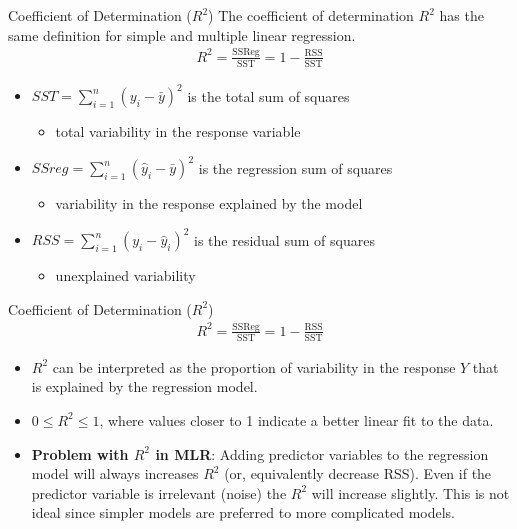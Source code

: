 \documentclass[10pt]{beamer}
\begin{document}
\begin{frame}{Coefficient of Determination ($R^2$)}
The coefficient of determination $R^2$ has the same definition for simple and multiple linear regression.
\begin{align*}
R^2 = \frac{\text{SSReg}}{\text{SST}} = 1 - \frac{\text{RSS}}{\text{SST}}
\end{align*}
\begin{itemize}
\item $SST = \sum_{i=1}^n (y_i - \bar{y})^2$ is the total sum of squares 
  \begin{itemize}
  \item total variability in the response variable
  \end{itemize}
\vspace{5pt}
\item $SSreg = \sum_{i=1}^n (\hat{y}_i - \bar{y})^2$ is the regression sum of squares
  \begin{itemize}
  \item variability in the response explained by the model
  \end{itemize}
\vspace{5pt}
\item $RSS = \sum_{i=1}^n (y_i - \hat{y}_i)^2$ is the residual sum of squares
  \begin{itemize}
  \item unexplained variability
  \end{itemize}
\end{itemize}
\end{frame}

\begin{frame}{Coefficient of Determination ($R^2$)}
\begin{align*}
R^2 = \frac{\text{SSReg}}{\text{SST}} = 1 - \frac{\text{RSS}}{\text{SST}}
\end{align*}
\begin{itemize}
\item $R^2$ can be interpreted as the proportion of variability in the response  $Y$ that is explained by the regression model.\\
\vspace{5pt}
\item $0 \leq R^2 \leq 1$, where values closer to 1 indicate a better linear fit to the data.\\
\vspace{5pt}
\item \textbf{Problem with $R^2$ in MLR}: Adding predictor variables to the regression model will always increases $R^2$ (or, equivalently decrease RSS).  Even if the predictor variable is irrelevant (noise) the $R^2$ will increase slightly.  This is not ideal since simpler models are preferred to more complicated models.
\end{itemize}
\end{frame}
\end{document}
